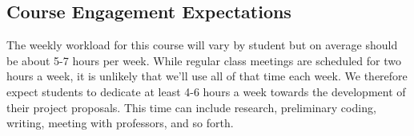 \documentclass[10pt]{article}
\begin{document}
\subsection{Course Engagement Expectations}

The weekly workload for this course will vary by student but on average should be about 5-7 hours per week.  While regular class meetings are scheduled for two hours a week, it is unlikely that we'll use all of that time each week.  We therefore expect students to dedicate at least 4-6 hours a week towards the development of their project proposals.  This time can include research, preliminary coding, writing, meeting with professors, and so forth.
\end{document}
